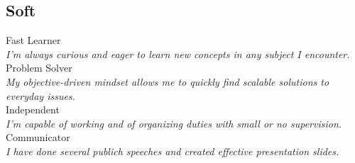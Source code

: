 \documentclass[letterpaper]{soragna-onepage-twocols} %
\begin{document}
\begin{minipage}[t]{0.3\textwidth}
\subsection{Soft}

Fast Learner\\
\emph{I'm always curious and eager to learn new concepts in any subject I encounter.}\\
Problem Solver\\
\emph{My objective-driven mindset allows me to quickly find scalable solutions to everyday issues.}\\
Independent\\
\emph{I'm capable of working and of organizing duties with small or no supervision.}\\
Communicator\\
\emph{I have done several publich speeches and created effective presentation slides.}\\




\end{minipage} %
\hfill
%
%
\end{document}
